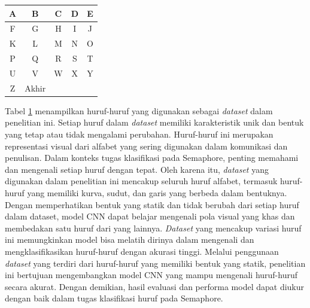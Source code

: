 \begin{table}[htbp]
	\centering
	\label{tab:datasetlabel}
	\begin{tabular}{|c|c|c|c|c|}
		\hline
		A & B & C & D & E \\
		\hline
		F & G & H & I & J \\
		\hline
		K & L & M & N & O \\
		\hline
		P & Q & R & S & T \\
		\hline
		U & V & W & X & Y \\
		\hline
		Z &   Akhir &   &   &   \\
		\hline
	\end{tabular}
\end{table}

Tabel \ref{tab:datasetlabel} menampilkan huruf-huruf yang digunakan sebagai \textit{dataset} dalam penelitian ini. Setiap huruf dalam \textit{dataset} memiliki karakteristik unik dan bentuk yang tetap atau tidak mengalami perubahan. Huruf-huruf ini merupakan representasi visual dari alfabet yang sering digunakan dalam komunikasi dan penulisan. Dalam konteks tugas klasifikasi pada Semaphore, penting memahami dan mengenali setiap huruf dengan tepat. Oleh karena itu, \textit{dataset} yang digunakan dalam penelitian ini mencakup seluruh huruf alfabet, termasuk huruf-huruf yang memiliki kurva, sudut, dan garis yang berbeda dalam bentuknya. Dengan memperhatikan bentuk yang statik dan tidak berubah dari setiap huruf dalam dataset, model CNN dapat belajar  mengenali pola visual yang khas dan membedakan satu huruf dari yang lainnya. \textit{Dataset} yang mencakup variasi huruf ini memungkinkan model bisa melatih dirinya dalam mengenali dan mengklasifikasikan huruf-huruf dengan akurasi tinggi. Melalui penggunaan \textit{dataset} yang terdiri dari huruf-huruf yang memiliki bentuk yang statik, penelitian ini bertujuan mengembangkan model CNN yang mampu mengenali huruf-huruf secara akurat. Dengan demikian, hasil evaluasi dan performa model dapat diukur dengan baik dalam tugas klasifikasi huruf pada Semaphore.

